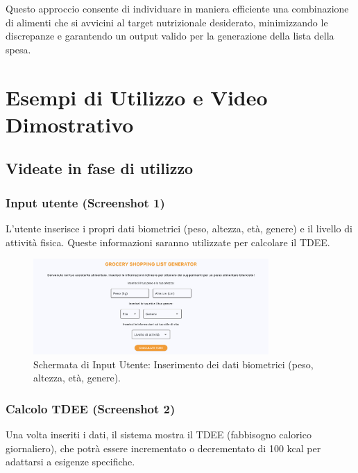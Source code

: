 \documentclass[11pt,a4paper]{article}
\begin{document}
Questo approccio consente di individuare in maniera efficiente una combinazione di alimenti che si avvicini al target nutrizionale desiderato, minimizzando le discrepanze e garantendo un output valido per la generazione della lista della spesa.





\section{Esempi di Utilizzo e Video Dimostrativo}

\subsection{Videate in fase di utilizzo}

\subsubsection{Input utente (Screenshot 1)}
L’utente inserisce i propri dati biometrici (peso, altezza, età, genere) e il livello di attività fisica. Queste informazioni saranno utilizzate per calcolare il TDEE.

\begin{figure}[h!]
    \centering
    \includegraphics[width=0.8\textwidth]{input_utente.png}
    \caption{Schermata di Input Utente: Inserimento dei dati biometrici (peso, altezza, età, genere).}
    \label{fig:input_utente}
\end{figure}

\subsubsection{Calcolo TDEE (Screenshot 2)}
Una volta inseriti i dati, il sistema mostra il TDEE (fabbisogno calorico giornaliero), che potrà essere incrementato o decrementato di 100 kcal per adattarsi a esigenze specifiche.
\end{document}
